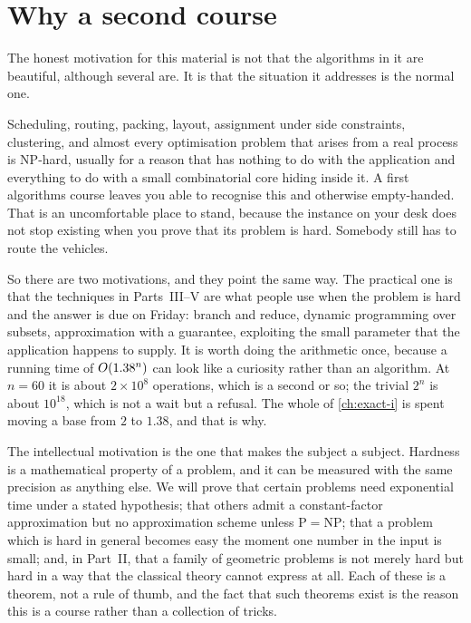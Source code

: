 \section{Why a second course}
\label{sec:intro-why}

The honest motivation for this material is not that the algorithms in it are
beautiful, although several are. It is that the situation it addresses is the
normal one.

Scheduling, routing, packing, layout, assignment under side constraints,
clustering, and almost every optimisation problem that arises from a real
process is \textrm{NP}-hard, usually for a reason that has nothing to do with
the application and everything to do with a small combinatorial core hiding
inside it. A first algorithms course leaves you able to recognise this and
otherwise empty-handed. That is an uncomfortable place to stand, because the
instance on your desk does not stop existing when you prove that its problem is
hard. Somebody still has to route the vehicles.

So there are two motivations, and they point the same way. The practical one is
that the techniques in Parts~III--V are what people use when the problem is
hard and the answer is due on Friday: branch and reduce, dynamic programming
over subsets, approximation with a guarantee, exploiting the small parameter
that the application happens to supply. It is worth doing the arithmetic once,
because a running time of $O\!\left(1.38^n\right)$ can look like a curiosity rather
than an algorithm. At $n = 60$ it is about $2 \times 10^{8}$ operations, which
is a second or so; the trivial $2^n$ is about $10^{18}$, which is not a wait
but a refusal. The whole of \cref{ch:exact-i} is spent moving a base from $2$
to $1.38$, and that is why.

The intellectual motivation is the one that makes the subject a subject.
Hardness is a mathematical property of a problem, and it can be measured with
the same precision as anything else. We will prove that certain problems need
exponential time under a stated hypothesis; that others admit a constant-factor
approximation but no approximation scheme unless $\mathrm{P} = \mathrm{NP}$; that a problem which is hard in
general becomes easy the moment one number in the input is small; and, in
Part~II, that a family of geometric problems is not merely hard but hard in a
way that the classical theory cannot express at all. Each of these is a
theorem, not a rule of thumb, and the fact that such theorems exist is the
reason this is a course rather than a collection of tricks.

